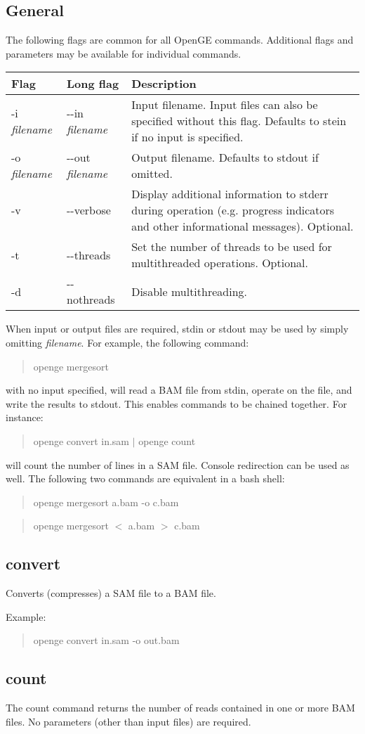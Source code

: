 \documentclass[11pt]{article}
\newcommand {\cmd}[1] {\begin{quote}#1\end{quote}}
\begin{document}
\subsection {General}
The following flags are common for all OpenGE commands. Additional flags and parameters may be available for individual commands.
\begin{center}
\begin{tabular}{llp{3.5in}}
\hline
Flag&Long flag&Description\\ \hline
-i \textit{filename}&{-}{-}in \textit{filename}&Input filename. Input files can also be specified without this flag. Defaults to stein if no input is specified.\\
-o \textit{filename}&{-}{-}out \textit{filename}&Output filename. Defaults to stdout if omitted. \\
-v&{-}{-}verbose&Display additional information to stderr during operation (e.g. progress indicators and other informational messages). Optional.\\
-t&{-}{-}threads&Set the number of threads to be used for multithreaded operations. Optional.\\
-d&{-}{-}nothreads&Disable multithreading.\\
\end{tabular}
\end{center}

When input or output files are required, stdin or stdout may be used by simply omitting \textit{filename}. For example, the following command:

\cmd{openge mergesort}

with no input specified, will read a BAM file from stdin, operate on the file, and write the results to stdout. This enables commands to be chained together. For instance:

\cmd{openge convert in.sam $|$ openge count}

will count the number of lines in a SAM file. Console redirection can be used as well. The following two commands are equivalent in a bash shell:

\cmd{openge mergesort a.bam -o c.bam}
\cmd{openge mergesort $<$ a.bam $>$ c.bam}

\subsection {convert}
Converts (compresses) a SAM file to a BAM file.

Example:
\cmd{openge convert in.sam -o out.bam}
\subsection {count}
The count command returns the number of reads contained in one or more BAM files. No parameters (other than input files) are required.
\end{document}
